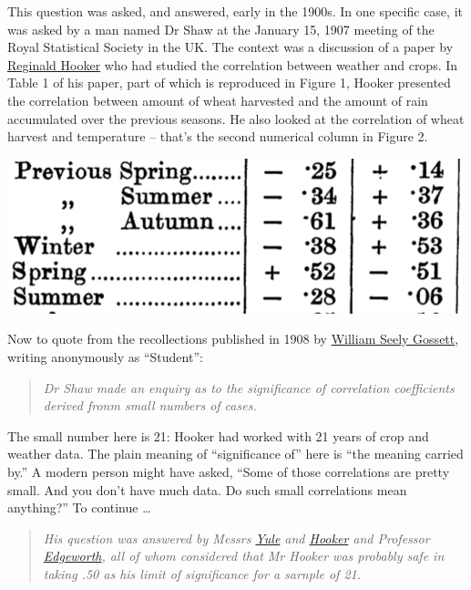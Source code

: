 \documentclass[]{tufte-book}
\begin{document}
This question was asked, and answered, early in the 1900s. In one specific case, it was asked by a man named Dr Shaw at the January 15, 1907 meeting of the Royal Statistical Society in the UK. The context was a discussion of a paper by \href{https://en.wikipedia.org/wiki/Reginald_Hawthorn_Hooker}{Reginald Hooker} who had studied the correlation between weather and crops. In Table 1 of his paper, part of which is reproduced in Figure 1, Hooker presented the correlation between amount of wheat harvested and the amount of rain accumulated over the previous seasons. He also looked at the correlation of wheat harvest and temperature -- that's the second numerical column in Figure 2.

\includegraphics[width=0.8\linewidth]{images/Hooker-correlations}

Now to quote from the recollections published in 1908 by \href{https://en.wikipedia.org/wiki/William_Sealy_Gosset}{William Seely Gossett}, writing anonymously as ``Student'':

\begin{quote}
\emph{Dr Shaw made an enquiry as to the significance of correlation coefficients derived fronm small numbers of cases.}
\end{quote}

The small number here is 21: Hooker had worked with 21 years of crop and weather data. The plain meaning of ``significance of'' here is ``the meaning carried by.'' A modern person might have asked, ``Some of those correlations are pretty small. And you don't have much data. Do such small correlations mean anything?'' To continue \ldots{}

\begin{quote}
\emph{His question was answered by Messrs \href{https://en.wikipedia.org/wiki/Udny_Yule}{Yule} and \href{https://en.wikipedia.org/wiki/Reginald_Hawthorn_Hooker}{Hooker} and Professor \href{https://en.wikipedia.org/wiki/Francis_Ysidro_Edgeworth}{Edgeworth}, all of whom considered that Mr Hooker was probably safe in taking .50 as his limit of significance for a sarnple of 21.}
\end{quote}
\end{document}
